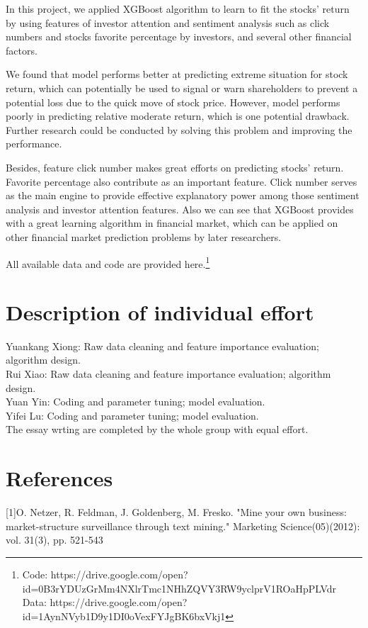 \documentclass[letterpaper]{article}
\begin{document}
In this project, we applied XGBoost algorithm to learn to fit the stocks' return by using features of investor attention and sentiment analysis such as click numbers and stocks favorite percentage by investors, and several other financial factors. 

We found that model performs better at predicting extreme situation for stock return, which can potentially be used to signal
or warn shareholders to prevent a potential loss due to the quick move of stock price. However, model performs poorly in predicting relative moderate return, which is one potential drawback. Further research could be conducted by solving this problem and improving the performance. 

Besides, feature click number makes great efforts on predicting stocks' return. Favorite percentage also contribute as an important feature. Click number serves as the main engine to provide effective explanatory power among those sentiment analysis and investor attention features. Also we can see that XGBoost provides with a great learning algorithm in financial market, which can be applied on other financial market prediction problems by later researchers.

All available data and code are provided here.\footnote{Code: https://drive.google.com/open?id=0B3rYDUzGrMm4NXlrTmc1NHhZQVY3RW9yclprV1ROaHpPLVdr
Data: https://drive.google.com/open?id=1AynNVyb1D9y1DI0oVexFYJgBK6bxVkj1}

\section{Description of individual effort}

Yuankang Xiong: Raw data cleaning and feature importance evaluation; algorithm design. \\
Rui Xiao: Raw data cleaning and feature importance evaluation; algorithm design.\\
Yuan Yin: Coding and parameter tuning; model evaluation.\\
Yifei Lu: Coding and parameter tuning; model evaluation.\\
The essay wrting are completed by the whole group with equal effort.

\section*{References}
[1]O. Netzer, R. Feldman, J. Goldenberg, M. Fresko. "Mine your own business: market-structure surveillance through text mining." Marketing Science(05)(2012): vol. 31(3), pp. 521-543
\end{document}
